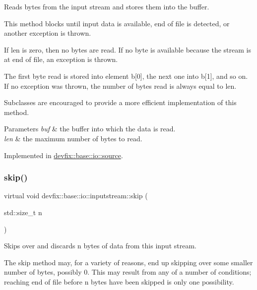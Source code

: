 Reads bytes from the input stream and stores them into the buffer. 

This method blocks until input data is available, end of file is detected, or another exception is thrown.

If len is zero, then no bytes are read. If no byte is available because the stream is at end of file, an exception is thrown.

The first byte read is stored into element b\mbox{[}0\mbox{]}, the next one into b\mbox{[}1\mbox{]}, and so on. If no exception was thrown, the number of bytes read is always equal to len.

Subclasses are encouraged to provide a more efficient implementation of this method.


\begin{DoxyParams}{Parameters}
{\em buf} & the buffer into which the data is read. \\
\hline
{\em len} & the maximum number of bytes to read. \\
\hline
\end{DoxyParams}


Implemented in \hyperlink{structdevfix_1_1base_1_1io_1_1source_a9fbd4d20aa150910ced44018e1b3156a}{devfix\+::base\+::io\+::source}.

\mbox{\label{structdevfix_1_1base_1_1io_1_1inputstream_a1868a733fd646b29daae6874e07e4e03}} 
\subsubsection{\texorpdfstring{skip()}{skip()}}
{\footnotesize\ttfamily virtual void devfix\+::base\+::io\+::inputstream\+::skip (\begin{DoxyParamCaption}\item[{std\+::size\+\_\+t}]{n }\end{DoxyParamCaption})\hspace{0.3cm}{\ttfamily [pure virtual]}}



Skips over and discards n bytes of data from this input stream. 

The skip method may, for a variety of reasons, end up skipping over some smaller number of bytes, possibly 0. This may result from any of a number of conditions; reaching end of file before n bytes have been skipped is only one possibility.


